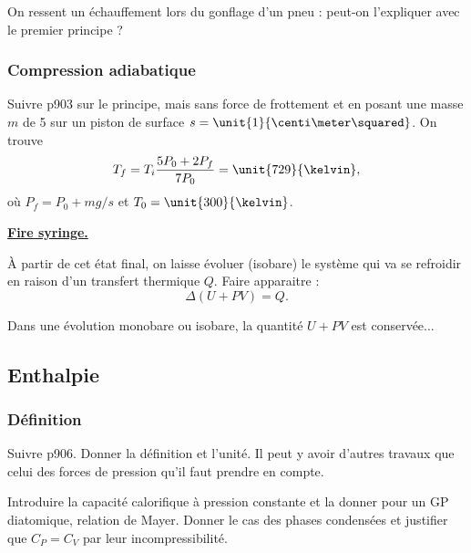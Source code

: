 \begin{transition}
On ressent un échauffement lors du gonflage d'un pneu : peut-on l'expliquer avec le premier principe ?
\end{transition}

\subsubsection{Compression adiabatique}

Suivre \cite{Salamito2016} p903 sur le principe, mais sans force de frottement et en posant une masse $m$ de \unit{5}{\kilo\gram} sur un piston de surface $s=\unit{1}{\centi\meter\squared}$.
On trouve
\begin{equation}
T_f = T_i \frac{5P_0+2P_f}{7P_0} = \unit{729}{\kelvin},
\end{equation}
où $P_f = P_0+mg/s$ et $T_0=\unit{300}{\kelvin}$.

\begin{slide}
\textbf{\href{https://youtu.be/4qe1Ueifekg?t=146}{Fire syringe.}}
\end{slide}

À partir de cet état final, on laisse évoluer (isobare) le système qui va se refroidir en raison d'un transfert thermique $Q$.
Faire apparaitre :
\begin{equation}
\Delta(U+PV) = Q.
\end{equation}

\begin{transition}
Dans une évolution monobare ou isobare, la quantité $U+PV$ est conservée...
\end{transition}

\subsection{Enthalpie}

\subsubsection{Définition}

Suivre \cite{Salamito2016} p906.
Donner la définition et l'unité.
Il peut y avoir d'autres travaux que celui des forces de pression qu'il faut prendre en compte.

Introduire la capacité calorifique à pression constante et la donner pour un GP diatomique, relation de Mayer.
Donner le cas des phases condensées et justifier que $C_P = C_V$ par leur incompressibilité.

